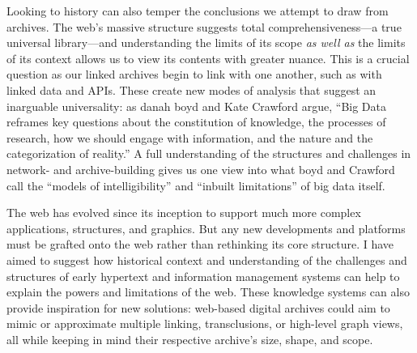 Looking to history can also temper the conclusions we attempt to draw from archives. The web's massive structure suggests total comprehensiveness---a true universal library---and understanding the limits of its scope \emph{as well as} the limits of its context allows us to view its contents with greater nuance. This is a crucial question as our linked archives begin to link with one another, such as with linked data and APIs. These create new modes of analysis that suggest an inarguable universality: as danah boyd and Kate Crawford argue, ``Big Data reframes key questions about the constitution of knowledge, the processes of research, how we should engage with information, and the nature and the categorization of reality.''\autocite{crawford_critical_2012} A full understanding of the structures and challenges in network- and archive-building gives us one view into what boyd and Crawford call the ``models of intelligibility'' and ``inbuilt limitations'' of big data itself.

The web has evolved since its inception to support much more complex applications, structures, and graphics. But any new developments and platforms must be grafted onto the web rather than rethinking its core structure. I have aimed to suggest how historical context and understanding of the challenges and structures of early hypertext and information management systems can help to explain the powers and limitations of the web. These knowledge systems can also provide inspiration for new solutions: web-based digital archives could aim to mimic or approximate multiple linking, transclusions, or high-level graph views, all while keeping in mind their respective archive's size, shape, and scope.
